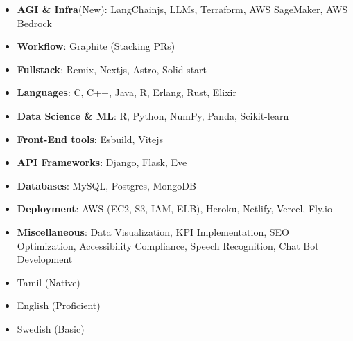 \newpage
\begin{minipage}[t]{0.29\textwidth} %

\colorbox{cvblue!90}
{\color{white}  %
  \textwidth\relax %
  \begin{minipage}[t][\textheight][t]{0.82\textwidth}
  \raggedright
  \vspace*{2.5ex}

  \Large
  \begin{itemize}
      \item \textbf{AGI \& Infra}(New): LangChainjs, LLMs, Terraform, AWS SageMaker, AWS Bedrock
      \item \textbf{Workflow}: Graphite (Stacking PRs)
      \item \textbf{Fullstack}: Remix, Nextjs, Astro, Solid-start
      \item \textbf{Languages}: C, C++, Java, R, Erlang, Rust, Elixir
      \item \textbf{Data Science \& ML}: R, Python, NumPy, Panda, Scikit-learn
      \item \textbf{Front-End tools}: Esbuild, Vitejs
      \item \textbf{API Frameworks}: Django, Flask, Eve
      \item \textbf{Databases}: MySQL, Postgres, MongoDB
      \item \textbf{Deployment}: AWS (EC2, S3, IAM, ELB), Heroku, Netlify, Vercel, Fly.io
      \item \textbf{Miscellaneous}: Data Visualization, KPI Implementation, SEO Optimization, Accessibility Compliance, Speech Recognition, Chat Bot Development
  \end{itemize}

  \Large
  \Large
  \begin{itemize}
  \setlength{\itemsep}{0.3em}
      \item Tamil (Native)
      \item English (Proficient)
      \item Swedish (Basic)
  \end{itemize}


\end{minipage}}
\end{minipage}
